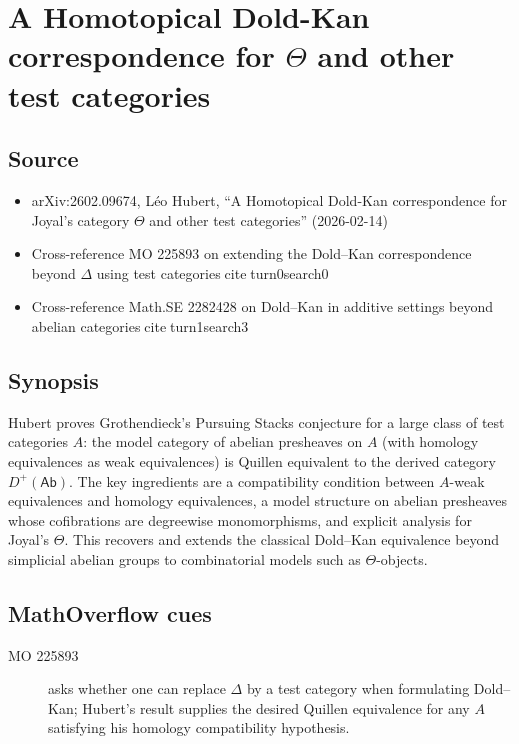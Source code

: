 \section*{A Homotopical Dold-Kan correspondence for $\Theta$ and other test categories}
\subsection*{Source}
\begin{itemize}
  \item arXiv:2602.09674, Léo Hubert, ``A Homotopical Dold-Kan correspondence for Joyal's category $\Theta$ and other test categories'' (2026-02-14)
  \item Cross-reference MO 225893 on extending the Dold--Kan correspondence beyond $\Delta$ using test categoriesciteturn0search0
  \item Cross-reference Math.SE 2282428 on Dold--Kan in additive settings beyond abelian categoriesciteturn1search3
\end{itemize}
\subsection*{Synopsis}
Hubert proves Grothendieck's Pursuing Stacks conjecture for a large class of test categories $A$: the model category of abelian presheaves on $A$ (with homology equivalences as weak equivalences) is Quillen equivalent to the derived category $D^+(\mathsf{Ab})$. The key ingredients are a compatibility condition between $A$-weak equivalences and homology equivalences, a model structure on abelian presheaves whose cofibrations are degreewise monomorphisms, and explicit analysis for Joyal's $\Theta$. This recovers and extends the classical Dold--Kan equivalence beyond simplicial abelian groups to combinatorial models such as $\Theta$-objects.
\subsection*{MathOverflow cues}
\begin{description}
  \item[MO 225893] asks whether one can replace $\Delta$ by a test category when formulating Dold--Kan; Hubert's result supplies the desired Quillen equivalence for any $A$ satisfying his homology compatibility hypothesis.
\end{description}
